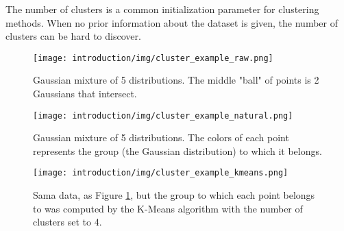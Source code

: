 The number of clusters is a common initialization parameter for clustering methods.
When no prior information about the dataset is given, the number of clusters can be hard to discover.

\begin{figure}[hbtp]
\centering
\texttt{[image: introduction/img/cluster\_example\_raw.png]}
\caption{Gaussian mixture of 5 distributions. The middle "ball" of points is 2 Gaussians that intersect.}
\label{fig:intro raw}
\end{figure}

\begin{figure}[hbtp]
\centering
\texttt{[image: introduction/img/cluster\_example\_natural.png]}
\caption{Gaussian mixture of 5 distributions. The colors of each point represents the group (the Gaussian distribution) to which it belongs.}
\label{fig:intro natural}
\end{figure}

\begin{figure}[hbtp]
\centering
\texttt{[image: introduction/img/cluster\_example\_kmeans.png]}
\caption{Sama data, as Figure \ref{fig:intro raw}, but the group to which each point belongs to was computed by the K-Means algorithm with the number of clusters set to 4.}
\label{fig:intro kmeans}
\end{figure}

% 

